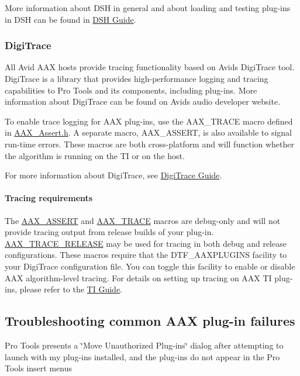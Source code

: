 More information about D\+S\+H in general and about loading and testing plug-\/ins in D\+S\+H can be found in \hyperlink{a00365}{D\+S\+H Guide}.

\hypertarget{a00360_subsection__digitrace}{}\subsubsection{Digi\+Trace}\label{a00360_subsection__digitrace}
 All Avid A\+A\+X hosts provide tracing functionality based on Avid\textquotesingle{}s Digi\+Trace tool. Digi\+Trace is a library that provides high-\/performance logging and tracing capabilities to Pro Tools and its components, including plug-\/ins. More information about Digi\+Trace can be found on Avid\textquotesingle{}s audio developer website.

To enable trace logging for A\+A\+X plug-\/ins, use the {\ttfamily A\+A\+X\+\_\+\+T\+R\+A\+C\+E} macro defined in {\ttfamily \hyperlink{a00158}{A\+A\+X\+\_\+\+Assert.\+h}}. A separate macro, {\ttfamily A\+A\+X\+\_\+\+A\+S\+S\+E\+R\+T}, is also available to signal run-\/time errors. These macros are both cross-\/platform and will function whether the algorithm is running on the T\+I or on the host.

For more information about Digi\+Trace, see \hyperlink{a00364}{Digi\+Trace Guide}.

\hypertarget{a00360_subsubsection__tracing_requirements}{}\paragraph{Tracing requirements}\label{a00360_subsubsection__tracing_requirements}
 The \hyperlink{a00158_a168ee44fd7a5485ab50160db36fb2988}{A\+A\+X\+\_\+\+A\+S\+S\+E\+R\+T} and \hyperlink{a00158_ab53f1d6a94f8b6ebb3a101f71bfe4e82}{A\+A\+X\+\_\+\+T\+R\+A\+C\+E} macros are debug-\/only and will not provide tracing output from release builds of your plug-\/in. \hyperlink{a00158_ac2aa820ece56bb59140ad561218db4b3}{A\+A\+X\+\_\+\+T\+R\+A\+C\+E\+\_\+\+R\+E\+L\+E\+A\+S\+E} may be used for tracing in both debug and release configurations. These macros require that the {\ttfamily D\+T\+F\+\_\+\+A\+A\+X\+P\+L\+U\+G\+I\+N\+S} facility to your Digi\+Trace configuration file. You can toggle this facility to enable or disable A\+A\+X algorithm-\/level tracing. For details on setting up tracing on A\+A\+X T\+I plug-\/ins, please refer to the \hyperlink{a00362}{T\+I Guide}.



 \hypertarget{a00360_aax_pro_tools_guide_06b_troubleshooting_aax_plugin_failures}{}\subsection{Troubleshooting common A\+A\+X plug-\/in failures}\label{a00360_aax_pro_tools_guide_06b_troubleshooting_aax_plugin_failures}
 Pro Tools presents a \char`\"{}\+Move Unauthorized Plug-\/ins\char`\"{} dialog after attempting to launch with my plug-\/ins installed, and the plug-\/ins do not appear in the Pro Tools insert menus 


